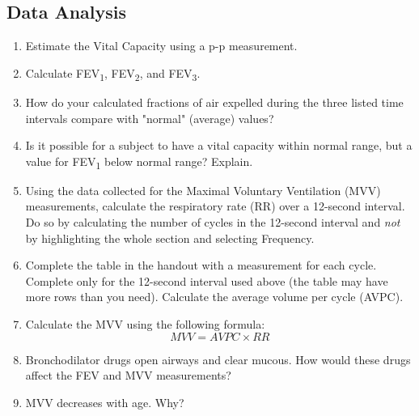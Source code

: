 \documentclass{article}
\begin{document}
\subsection*{Data Analysis}
\begin{enumerate}
	\item Estimate the Vital Capacity using a p-p measurement.
	\item Calculate FEV\textsubscript{1}, FEV\textsubscript{2}, and FEV\textsubscript{3}.
	\item How do your calculated fractions of air expelled during the three listed time intervals compare with "normal" (average) values?
	\item Is it possible for a subject to have a vital capacity within normal range, but a value for FEV\textsubscript{1} below normal range? Explain.
	\item Using the data collected for the Maximal Voluntary Ventilation (MVV) measurements, calculate the respiratory rate (RR) over a 12-second interval. Do so by calculating the number of cycles in the 12-second interval and \textit{not} by highlighting the whole section and selecting Frequency.
	\item Complete the table in the handout with a measurement for each cycle. Complete only for the 12-second interval used above (the table may have more rows than you need). Calculate the average volume per cycle (AVPC).
	\item Calculate the MVV using the following formula:\begin{equation}
		MVV = AVPC \times RR
	\end{equation}
	
	\item Bronchodilator drugs open airways and clear mucous. How would these drugs affect the FEV and MVV measurements?
	\item MVV decreases with age. Why?
\end{enumerate}
\end{document}
